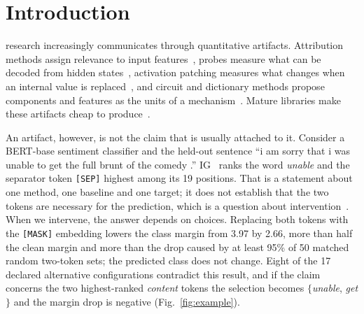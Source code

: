 \section{Introduction}
\label{sec:intro}

 research increasingly communicates through quantitative artifacts. Attribution methods assign relevance to input features~\cite{simonyan2014saliency,sundararajan2017ig,lundberg2017shap}, probes measure what can be decoded from hidden states~\cite{belinkov2022probing}, activation patching measures what changes when an internal value is replaced~\cite{meng2022rome,zhang2024patching}, and circuit and dictionary methods propose components and features as the units of a mechanism~\cite{wang2023ioi,conmy2023acdc,huben2024sae}. Mature libraries make these artifacts cheap to produce~\cite{kokhlikyan2020captum,nanda2022transformerlens,fiottokaufman2025nnsight,wu2024pyvene,bloom2024saelens}.

An artifact, however, is not the claim that is usually attached to it. Consider a BERT-base sentiment classifier and the held-out sentence ``i am sorry that i was unable to get the full brunt of the comedy .'' IG~\cite{sundararajan2017ig} ranks the word \textit{unable} and the separator token \texttt{[SEP]} highest among its 19 positions. That is a statement about one method, one baseline and one target; it does not establish that the two tokens are necessary for the prediction, which is a question about intervention~\cite{jacovi2020faithfulness,joshi2026causality}. When we intervene, the answer depends on choices. Replacing both tokens with the \texttt{[MASK]} embedding lowers the class margin from 3.97 by 2.66, more than half the clean margin and more than the drop caused by at least 95\% of 50 matched random two-token sets; the predicted class does not change. Eight of the 17 declared alternative configurations contradict this result, and if the claim concerns the two highest-ranked \emph{content} tokens the selection becomes $\{$\textit{unable}, \textit{get}$\}$ and the margin drop is negative (Fig.~\ref{fig:example}).

